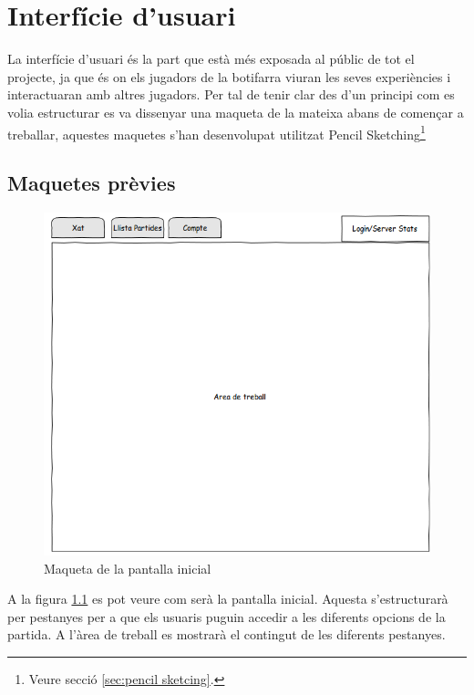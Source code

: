 \chapter{Interfície d'usuari}
\label{chap:interficie_usuari}

La interfície d'usuari és la part que està més exposada al públic de tot el projecte, ja que és on els jugadors de la botifarra viuran les seves experiències i interactuaran amb altres jugadors. Per tal de tenir clar des d'un principi com es volia estructurar es va dissenyar una maqueta de la mateixa abans de començar a treballar, aquestes maquetes s'han desenvolupat utilitzat Pencil Sketching\footnote{Veure secció \ref{sec:pencil sketcing}.}

\section{Maquetes prèvies}

\begin{figure}[htbp]
\centering\includegraphics[width=14cm]{img/Inici.png}
\caption{Maqueta de la pantalla inicial}
\label{fig:mookup-inici}
\end{figure} 

A la figura \ref{fig:mookup-inici} es pot veure com serà la pantalla inicial. Aquesta s'estructurarà per pestanyes per a que els usuaris puguin accedir a les diferents opcions de la partida. A l'àrea de treball es mostrarà el contingut de les diferents pestanyes. 

